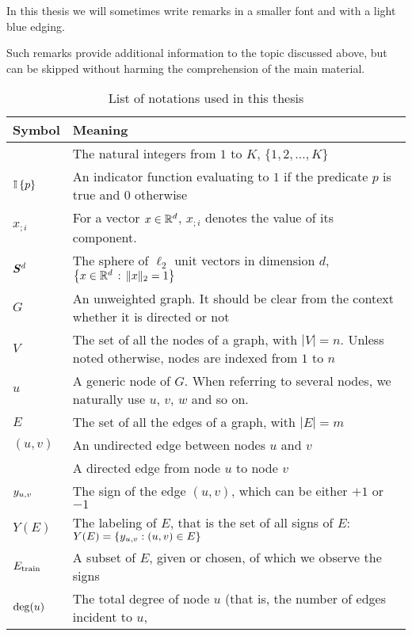 In this thesis we will sometimes write remarks in a smaller font and with a light blue edging.
\begin{aside}
  Such remarks provide additional information to the topic discussed above, but can be skipped
  without harming the comprehension of the main material.
\end{aside}

\begin{table*}[thpb]
\begin{adjustwidth}{-2cm}{}
  \centering
  \caption{List of notations used in this thesis}\label{tab:notations}%
  \vspace{-.5\baselineskip}
  \begin{tabulary}{179mm}{LL}
    \toprule
    Symbol & Meaning \\
    \midrule
    \rangek{} & The natural integers from $1$ to $K$, \ie{} $\{1, 2, \ldots, K \}$ \\
    $\mathbb{I}\left\{{p}\right\}$ & An indicator function evaluating to $1$ if the predicate $p$ is true and $0$ otherwise \\
    $x_{;i}$ & For a vector $x\in \mathbb{R}^d$, $x_{;i}$ denotes the value of its \ith{} component. \\
    $\bm{S}^d{}$ & The sphere of $\ell_2$ unit vectors in dimension $d$, \ie{} $\left\{ {x \in
    \mathbb{R}^d} \,:\, {\|x\|_2 = 1} \right\}$ \\
    \midrule
    $G$ & An unweighted graph. It should be clear from the context whether it is directed or not \\
    $V$ & The set of all the nodes of a graph, with $|V|=n$. Unless noted otherwise, nodes are indexed from $1$ to $n$ \\
    $u$ & A generic node of $G$. When referring to several nodes, we naturally use $u$, $v$, $w$ and so on. \\
    $E$ & The set of all the edges of a graph, with $|E|=m$ \\
    $(u,v)$ & An undirected edge between nodes $u$ and $v$ \\
    \euv{} & A directed edge from node $u$ to node $v$ \\
    $y_{u, v}{}$ & The sign of the edge $(u,v)$, which can be either $+1$ or $-1$ \\
    $Y(E)$ & The labeling of $E$, that is the set of all signs of $E$: $Y(E) = \{y_{u, v} : (u,v)\in E\}$ \\
    $E_{\mathrm{train}}$ & A subset of $E$, given or chosen, of which we observe the signs \\
    $\operatorname{deg}(u)$ & The total degree of node $u$ (that is, the number of edges incident to $u$,

\end{tabulary}
\end{adjustwidth}
\end{table*}

